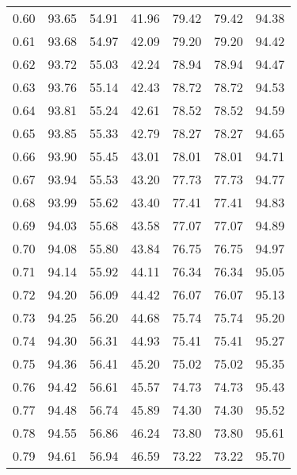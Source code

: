 \begin{tabular}{|c|c|c|c|c|c|c|}
      0.60 &     93.65 &     54.91 &      41.96 &   79.42 &      79.42 &         94.38 \\
      0.61 &     93.68 &     54.97 &      42.09 &   79.20 &      79.20 &         94.42 \\
      0.62 &     93.72 &     55.03 &      42.24 &   78.94 &      78.94 &         94.47 \\
      0.63 &     93.76 &     55.14 &      42.43 &   78.72 &      78.72 &         94.53 \\
      0.64 &     93.81 &     55.24 &      42.61 &   78.52 &      78.52 &         94.59 \\
      0.65 &     93.85 &     55.33 &      42.79 &   78.27 &      78.27 &         94.65 \\
      0.66 &     93.90 &     55.45 &      43.01 &   78.01 &      78.01 &         94.71 \\
      0.67 &     93.94 &     55.53 &      43.20 &   77.73 &      77.73 &         94.77 \\
      0.68 &     93.99 &     55.62 &      43.40 &   77.41 &      77.41 &         94.83 \\
      0.69 &     94.03 &     55.68 &      43.58 &   77.07 &      77.07 &         94.89 \\
      0.70 &     94.08 &     55.80 &      43.84 &   76.75 &      76.75 &         94.97 \\
      0.71 &     94.14 &     55.92 &      44.11 &   76.34 &      76.34 &         95.05 \\
      0.72 &     94.20 &     56.09 &      44.42 &   76.07 &      76.07 &         95.13 \\
      0.73 &     94.25 &     56.20 &      44.68 &   75.74 &      75.74 &         95.20 \\
      0.74 &     94.30 &     56.31 &      44.93 &   75.41 &      75.41 &         95.27 \\
      0.75 &     94.36 &     56.41 &      45.20 &   75.02 &      75.02 &         95.35 \\
      0.76 &     94.42 &     56.61 &      45.57 &   74.73 &      74.73 &         95.43 \\
      0.77 &     94.48 &     56.74 &      45.89 &   74.30 &      74.30 &         95.52 \\
      0.78 &     94.55 &     56.86 &      46.24 &   73.80 &      73.80 &         95.61 \\
      0.79 &     94.61 &     56.94 &      46.59 &   73.22 &      73.22 &         95.70 \\

\end{tabular}
